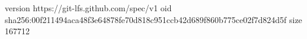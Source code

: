version https://git-lfs.github.com/spec/v1
oid sha256:00f211494aca48f3e64878fe70d818c951ccb42d689f860b775ce02f7d824d5f
size 167712
